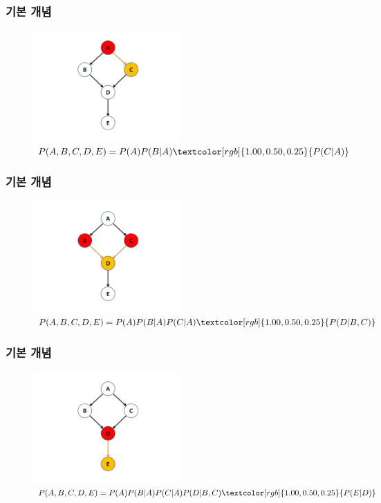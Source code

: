 \documentclass{beamer}
\begin{document}
\begin{frame}
\frametitle{기본 개념}

	\begin{figure}
		\includegraphics[height=120pt]{images/image96}
		\caption{{\scriptsize{}$P(A,B,C,D,E)=P(A)P(B|A)\textcolor[rgb]{1.00,0.50,0.25}{P(C|A)}$}}
	\end{figure}

\end{frame}



\begin{frame}
\frametitle{기본 개념}

	\begin{figure}
		\includegraphics[height=120pt]{images/image97}
		\caption{{\scriptsize{}$P(A,B,C,D,E)=P(A)P(B|A)P(C|A)\textcolor[rgb]{1.00,0.50,0.25}{P(D|B,C)}$}}
	\end{figure}

\end{frame}



\begin{frame}
\frametitle{기본 개념}

	\begin{figure}
		\includegraphics[height=120pt]{images/image98}
		\caption{{\scriptsize{}$P(A,B,C,D,E)=P(A)P(B|A)P(C|A)P(D|B,C)\textcolor[rgb]{1.00,0.50,0.25}{P(E|D)}$}}
	\end{figure}

\end{frame}
\end{document}
